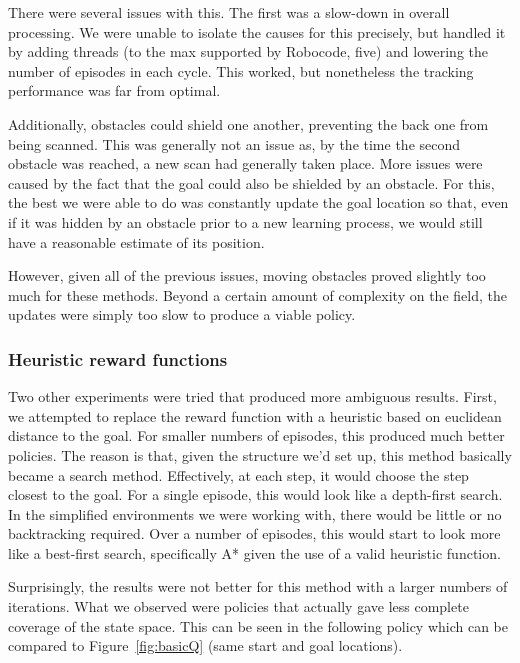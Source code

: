 \documentclass{aiaa-tc}%
\begin{document}
There were several issues with this. The first was a slow-down in overall processing. We were unable to isolate the causes for this precisely, but handled it by adding threads (to the max supported by Robocode, five) and lowering the number of episodes in each cycle. This worked, but nonetheless the tracking performance was far from optimal.

Additionally, obstacles could shield one
another, preventing the back one from being scanned. This was
generally not an issue as, by the time the second obstacle was
reached, a new scan had generally taken place. More issues were caused
by the fact that the goal could also be shielded by an
obstacle. For this, the best we were able to do was constantly update
the goal location so that, even if it was hidden by an obstacle prior
to a new learning process, we would still have a reasonable estimate
of its position.

However, given all of the previous issues, moving obstacles proved
slightly too much for these methods. Beyond a certain amount of
complexity on the field, the updates were simply too slow to produce a
viable policy.

\subsubsection{Heuristic reward functions}

Two other experiments were tried that produced more ambiguous
results. First, we attempted to replace the reward function with a
heuristic based on euclidean distance to the goal. For smaller numbers
of episodes, this produced much better policies. The reason is that,
given the structure we'd set up, this method basically became a
search method. Effectively, at each step, it
would choose the step closest to the goal. For a single episode,
this would look like a depth-first search. In the simplified
environments we were working with, there would be little or no
backtracking required. Over a number of episodes, this would start to
look more like a best-first search, specifically A* given the use of a
valid heuristic function.

Surprisingly, the results were not better for this method with a larger
numbers of iterations. What we observed were policies that actually
gave less complete coverage of the state space. This can be seen in
the following policy which can be compared to Figure~\ref{fig:basicQ} (same
start and goal locations).

\vspace{.3in}
\end{document}
